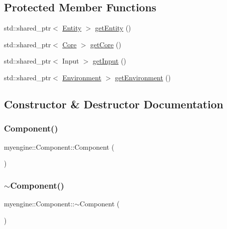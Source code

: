 \subsection*{Protected Member Functions}
\begin{DoxyCompactItemize}
\item 
std\+::shared\+\_\+ptr$<$ \hyperlink{classmyengine_1_1_entity}{Entity} $>$ \hyperlink{classmyengine_1_1_component_af409385720cc0c533e8812e8857ba161}{get\+Entity} ()
\item 
std\+::shared\+\_\+ptr$<$ \hyperlink{classmyengine_1_1_core}{Core} $>$ \hyperlink{classmyengine_1_1_component_a2b80c2d91dac8f429f6b6f6305d7c5be}{get\+Core} ()
\item 
std\+::shared\+\_\+ptr$<$ Input $>$ \hyperlink{classmyengine_1_1_component_a3e1451f5c1435ee6d69adf1644075a69}{get\+Input} ()
\item 
std\+::shared\+\_\+ptr$<$ \hyperlink{classmyengine_1_1_environment}{Environment} $>$ \hyperlink{classmyengine_1_1_component_a9b5c293015d5682398462b04cd41ed5a}{get\+Environment} ()
\end{DoxyCompactItemize}


\subsection{Constructor \& Destructor Documentation}
\mbox{\label{classmyengine_1_1_component_ae49096ab7e0b46617d28206315bef1a9}} 
\subsubsection{\texorpdfstring{Component()}{Component()}}
{\footnotesize\ttfamily myengine\+::\+Component\+::\+Component (\begin{DoxyParamCaption}{ }\end{DoxyParamCaption})}

\mbox{\label{classmyengine_1_1_component_ae2938d7961851517b781318a9005ba2c}} 
\subsubsection{\texorpdfstring{$\sim$\+Component()}{~Component()}}
{\footnotesize\ttfamily myengine\+::\+Component\+::$\sim$\+Component (\begin{DoxyParamCaption}{ }\end{DoxyParamCaption})}



